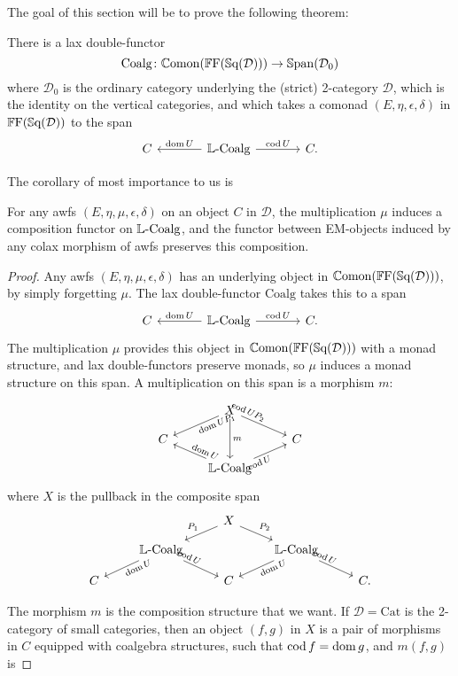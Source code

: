 The goal of this section will be to prove the following theorem:

\begin{theorem}
	There is a lax double-functor
	\[
		\mathrm{Coalg}\colon \mathbb{C}\mathrm{omon}(\mathbb{F}\mathrm{F}(\mathbb{S}\mathrm{q}(\mathcal{D}))) \to \mathbb{S}\mathrm{pan}(\mathcal{D}_0)
	\] 
	where $\mathcal{D}_0$ is the ordinary category underlying the (strict) 2-category $\mathcal{D}$, which is the identity on the vertical categories, and which takes a comonad $(E,\eta,\epsilon,\delta)$ in $\mathbb{F}\mathrm{F}(\mathbb{S}\mathrm{q}(\mathcal{D}))$ to the span
	\[
	\begin{tikzcd}[column sep=large]
		C & \LCoalg \lar[swap]{\dom U} \rar{\cod U} & C.
	\end{tikzcd}
	\]
\end{theorem}

The corollary of most importance to us is

\begin{corollary}
	For any awfs $(E,\eta,\mu,\epsilon,\delta)$ on an object $C$ in $\mathcal{D}$, the multiplication $\mu$ induces a composition functor on $\mathbb{L}\text{-}\mathrm{Coalg}$, and the functor between EM-objects induced by any colax morphism of awfs preserves this composition.
\end{corollary}
\begin{proof}
	Any awfs $(E,\eta,\mu,\epsilon,\delta)$ has an underlying object in $\mathbb{C}\mathrm{omon}(\mathbb{F}\mathrm{F}(\mathbb{S}\mathrm{q}(\mathcal{D})))$, by simply forgetting $\mu$. The lax double-functor $\mathrm{Coalg}$ takes this to a span
	\[
	\begin{tikzcd}[column sep=large]
		C & \LCoalg \lar[swap]{\dom U} \rar{\cod U} & C.
	\end{tikzcd}
	\]
	The multiplication $\mu$ provides this object in $\mathbb{C}\mathrm{omon}(\mathbb{F}\mathrm{F}(\mathbb{S}\mathrm{q}(\mathcal{D})))$ with a monad structure, and lax double-functors preserve monads, so $\mu$ induces a monad structure on this span. A multiplication on this span is a morphism $m$:
	\[
	\begin{tikzcd}[row sep=small,sloped,pos=.1]
		{} & X \dlar[swap]{\dom UP_1} \drar{\cod UP_2} \ar{dd}[sloped=false,pos=.5]{m} & \\
		C && C \\
		& \LCoalg \ular{\dom U} \urar[swap]{\cod U}
	\end{tikzcd}
	\]
	where $X$ is the pullback in the composite span
	\[
	\begin{tikzcd}[row sep=small]
		{} && X \dlar[swap]{P_1} \drar{P_2} && \\
		& \LCoalg \dlar[swap,sloped,pos=.1]{\dom U} \drar[sloped,pos=.1]{\cod U}
			&& \LCoalg \dlar[swap,sloped,pos=.1]{\dom U} \drar[sloped,pos=.1]{\cod U} & \\
		C && C && C.
	\end{tikzcd}
	\]

	The morphism $m$ is the composition structure that we want. If $\mathcal{D}=\mathrm{Cat}$ is the 2-category of small categories, then an object $(f,g)$ in $X$ is a pair of morphisms in $C$ equipped with coalgebra structures, such that $\operatorname{cod} f = \operatorname{dom} g$, and $m(f,g)$ is 
\end{proof}

